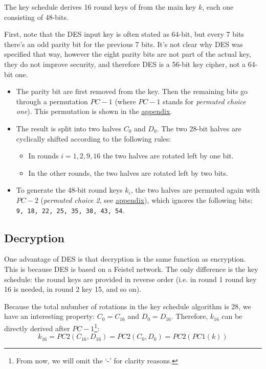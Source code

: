 \documentclass{article}
\begin{document}
  The key schedule derives 16 round keys of from the main key $k$,
  each one consisting of 48-bits. 

  First, note that the DES input key is often stated as 64-bit, but
  every 7 bits there's an odd parity bit for the previous 7 bits.
  It's not clear why DES was specified that way, however the eight
  parity bits are not part of the actual key, they do not improve
  security, and therefore DES is a
  56-bit key cipher, not a 64-bit one.

  \begin{itemize}
	\item The parity bit are first removed from the key. Then the remaining
	  bits go through a permutation $PC-1$ (where $PC-1$ stands for
	  \emph{permuted choice one}). This permutation is shown in the
	  \hyperlink{appendix}{appendix}.
	\item The result is split into two halves $C_{0}$ and $D_{0}$.
	  The two 28-bit halves are cyclically shifted according to the
	  following rules:
	  \begin{itemize}
		\item In rounds $i = 1,2,9,16$ the two halves are rotated left
		  by one bit.
		\item In the other rounds, the two halves are rotated left by
		  two bits.
	  \end{itemize}
	\item To generate the 48-bit round keys $k_{i}$, the two halves
	  are permuted again with $PC-2$ (\emph{permuted choice 2}, see
	  \hyperlink{appendix}{appendix}), which
	  ignores the following bits: \texttt{9, 18, 22, 25, 35, 38, 43, 54}.
  \end{itemize}

  \subsection{Decryption}

  One advantage of DES is that decryption is the same function as
  encryption. This is because DES is based on a Feistel network.
  The only difference is the key schedule: the round keys are provided
  in reverse order (i.e. in round 1 round key 16 is needed, in round 2
  key 15, and so on).

  Because the total nubmber of rotations in the key schedule algorithm
  is 28, we have an interesting property: $C_{0} = C_{16}$ and $D_{0}
  = D_{16}$.
  Therefore, $k_{16}$ can be directly derived after
  $PC-1$\footnote{From now, we will omit the ‘-’ for clarity reasons.}:
  $$
	k_{16} = PC2(C_{16},D_{16}) = PC2(C_{0}, D_{0}) = PC2(PC1(k))	
  $$
\end{document}
